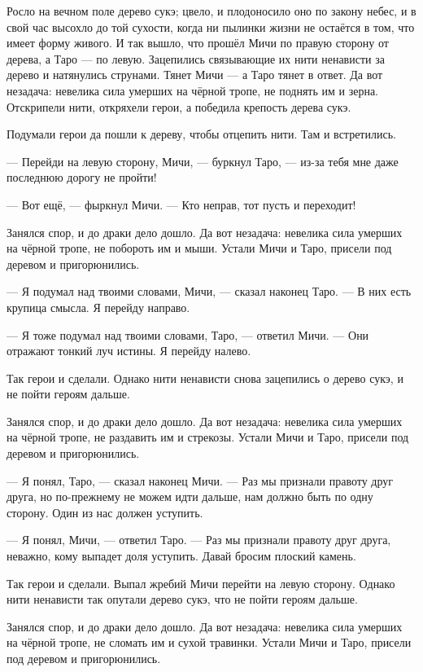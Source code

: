 Росло на вечном поле дерево сукэ\FM;
цвело, и плодоносило оно по закону небес, и в свой час высохло до той сухости, когда ни пылинки жизни не остаётся в том, что имеет форму живого.
И так вышло, что прошёл Мичи по правую сторону от дерева, а Таро --- по левую.
Зацепились связывающие их нити ненависти за дерево и натянулись струнами.
Тянет Мичи --- а Таро тянет в ответ.
Да вот незадача: невелика сила умерших на чёрной тропе, не поднять им и зерна.
Отскрипели нити, откряхели герои, а победила крепость дерева сукэ.

Подумали герои да пошли к дереву, чтобы отцепить нити.
Там и встретились.

--- Перейди на левую сторону, Мичи, --- буркнул Таро, --- из-за тебя мне даже последнюю дорогу не пройти!

--- Вот ещё, --- фыркнул Мичи.
--- Кто неправ, тот пусть и переходит!

Занялся спор, и до драки дело дошло.
Да вот незадача: невелика сила умерших на чёрной тропе, не побороть им и мыши.
Устали Мичи и Таро, присели под деревом и пригорюнились.

--- Я подумал над твоими словами, Мичи, --- сказал наконец Таро.
--- В них есть крупица смысла.
Я перейду направо.

--- Я тоже подумал над твоими словами, Таро, --- ответил Мичи.
--- Они отражают тонкий луч истины.
Я перейду налево.

Так герои и сделали.
Однако нити ненависти снова зацепились о дерево сукэ, и не пойти героям дальше.

Занялся спор, и до драки дело дошло.
Да вот незадача: невелика сила умерших на чёрной тропе, не раздавить им и стрекозы.
Устали Мичи и Таро, присели под деревом и пригорюнились.

--- Я понял, Таро, --- сказал наконец Мичи.
--- Раз мы признали правоту друг друга, но по-прежнему не можем идти дальше, нам должно быть по одну сторону.
Один из нас должен уступить.

--- Я понял, Мичи, --- ответил Таро.
--- Раз мы признали правоту друг друга, неважно, кому выпадет доля уступить.
Давай бросим плоский камень.

Так герои и сделали.
Выпал жребий Мичи перейти на левую сторону.
Однако нити ненависти так опутали дерево сукэ, что не пойти героям дальше.

Занялся спор, и до драки дело дошло.
Да вот незадача: невелика сила умерших на чёрной тропе, не сломать им и сухой травинки.
Устали Мичи и Таро, присели под деревом и пригорюнились.

